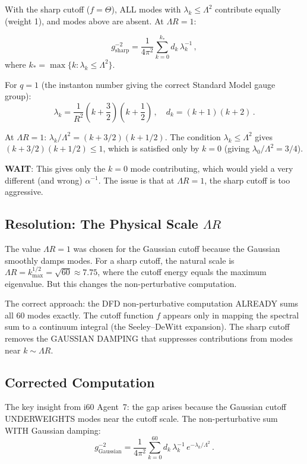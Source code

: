 \documentclass[11pt,a4paper]{article}
\begin{document}
With the sharp cutoff ($f = \Theta$), ALL modes with $\lambda_k \leq \Lambda^2$ contribute equally (weight 1), and modes above are absent. At $\Lambda R = 1$:

\begin{equation}
g^{-2}_{\mathrm{sharp}} = \frac{1}{4\pi^2}\sum_{k=0}^{k_*} d_k\,\lambda_k^{-1}\,,
\end{equation}
where $k_* = \max\{k : \lambda_k \leq \Lambda^2\}$.

For $q = 1$ (the instanton number giving the correct Standard Model gauge group):
\begin{equation}
\lambda_k = \frac{1}{R^2}\left(k + \frac{3}{2}\right)\left(k + \frac{1}{2}\right)\,, \quad d_k = (k+1)(k+2)\,.
\end{equation}

At $\Lambda R = 1$: $\lambda_k/\Lambda^2 = (k + 3/2)(k + 1/2)$. The condition $\lambda_k \leq \Lambda^2$ gives $(k + 3/2)(k + 1/2) \leq 1$, which is satisfied only by $k = 0$ (giving $\lambda_0/\Lambda^2 = 3/4$).

\textbf{WAIT}: This gives only the $k = 0$ mode contributing, which would yield a very different (and wrong) $\alpha^{-1}$. The issue is that at $\Lambda R = 1$, the sharp cutoff is too aggressive.

\subsection{Resolution: The Physical Scale $\Lambda R$}

The value $\Lambda R = 1$ was chosen for the Gaussian cutoff because the Gaussian smoothly damps modes. For a sharp cutoff, the natural scale is $\Lambda R = k_{\max}^{1/2} = \sqrt{60} \approx 7.75$, where the cutoff energy equals the maximum eigenvalue. But this changes the non-perturbative computation.

The correct approach: the DFD non-perturbative computation ALREADY sums all 60 modes exactly. The cutoff function $f$ appears only in mapping the spectral sum to a continuum integral (the Seeley--DeWitt expansion). The sharp cutoff removes the GAUSSIAN DAMPING that suppresses contributions from modes near $k \sim \Lambda R$.

\subsection{Corrected Computation}

The key insight from i60 Agent~7: the gap arises because the Gaussian cutoff UNDERWEIGHTS modes near the cutoff scale. The non-perturbative sum WITH Gaussian damping:
\begin{equation}
g^{-2}_{\mathrm{Gaussian}} = \frac{1}{4\pi^2}\sum_{k=0}^{60} d_k\,\lambda_k^{-1}\,e^{-\lambda_k/\Lambda^2}\,.
\end{equation}
\end{document}
